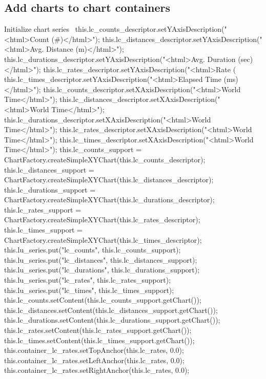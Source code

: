 \subsection{Add charts to chart containers}
\nwenddocs{}\endmoddef{}
\LA{}Initialize chart series~{\nwtagstyle{}}\RA{}
this.lc_counts_descriptor.setYAxisDescription("<html>Count (#)</html>");
this.lc_distances_descriptor.setYAxisDescription("<html>Avg. Distance (m)</html>");
this.lc_durations_descriptor.setYAxisDescription("<html>Avg. Duration (sec)</html>");
this.lc_rates_descriptor.setYAxisDescription("<html>Rate (%
this.lc_times_descriptor.setYAxisDescription("<html>Elapsed Time (ms)</html>");
this.lc_counts_descriptor.setXAxisDescription("<html>World Time</html>");
this.lc_distances_descriptor.setXAxisDescription("<html>World Time</html>");
this.lc_durations_descriptor.setXAxisDescription("<html>World Time</html>");
this.lc_rates_descriptor.setXAxisDescription("<html>World Time</html>");
this.lc_times_descriptor.setXAxisDescription("<html>World Time</html>");
this.lc_counts_support = ChartFactory.createSimpleXYChart(this.lc_counts_descriptor);
this.lc_distances_support = ChartFactory.createSimpleXYChart(this.lc_distances_descriptor);
this.lc_durations_support = ChartFactory.createSimpleXYChart(this.lc_durations_descriptor);
this.lc_rates_support = ChartFactory.createSimpleXYChart(this.lc_rates_descriptor);
this.lc_times_support = ChartFactory.createSimpleXYChart(this.lc_times_descriptor);
this.lu_series.put("lc_counts", this.lc_counts_support);
this.lu_series.put("lc_distances", this.lc_distances_support);
this.lu_series.put("lc_durations", this.lc_durations_support);
this.lu_series.put("lc_rates", this.lc_rates_support);
this.lu_series.put("lc_times", this.lc_times_support);
this.lc_counts.setContent(this.lc_counts_support.getChart());
this.lc_distances.setContent(this.lc_distances_support.getChart());
this.lc_durations.setContent(this.lc_durations_support.getChart());
this.lc_rates.setContent(this.lc_rates_support.getChart());
this.lc_times.setContent(this.lc_times_support.getChart());
this.container_lc_rates.setTopAnchor(this.lc_rates, 0.0);
this.container_lc_rates.setLeftAnchor(this.lc_rates, 0.0);
this.container_lc_rates.setRightAnchor(this.lc_rates, 0.0);
